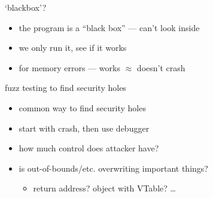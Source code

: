 \begin{frame}{`blackbox'?}
    \begin{itemize}
    \item the program is a ``black box'' --- can't look inside
    \item we only run it, see if it works
    \item for memory errors --- works $\approx$ doesn't crash
    \end{itemize}
\end{frame}

\begin{frame}{fuzz testing to find security holes}
    \begin{itemize}
    \item common way to find security holes
    \item start with crash, then use debugger
    \vspace{.5cm}
    \item how much control does attacker have?
    \item is out-of-bounds/etc. overwriting important things?
        \begin{itemize}
        \item return address? object with VTable? \ldots
        \end{itemize}
    \end{itemize}
\end{frame}

